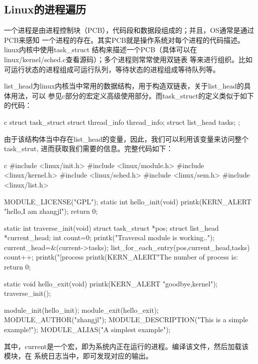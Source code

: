 \subsection{Linux的进程遍历}
一个进程是由进程控制块（PCB），代码段和数据段组成的；并且，OS通常是通过PCB来感知
一个进程的存在。其实PCB就是操作系统对每个进程的代码描述。linux内核中使用task\_struct
结构来描述一个PCB（具体可以在linux/kernel/sched.c查看源码）；多个进程则常常使用双链表
等来进行组织。比如可运行状态的进程组成可运行队列，等待状态的进程组成等待队列等。

list\_head为linux内核当中常用的数据结构，用于构造双链表，关于list\_head的具体用法，可以
参见c部分的宏定义高级使用部分。而task\_struct的定义类似于如下的代码：
\begin{code-block}{c}
struct task_struct {
        struct thread_info    thread_info;
        struct list_head      tasks;
};
\end{code-block}

由于该结构体当中存在list\_head的变量，因此，我们可以利用该变量来访问整个task\_strut,
进而获取我们需要的信息。完整代码如下：
\begin{code-block}{c}
#include <linux/init.h>
#include <linux/module.h>
#include <linux/kernel.h>
#include <linux/sched.h>
#include <linux/sem.h>
#include <linux/list.h>

MODULE_LICENSE("GPL");
static int hello_init(void)
{
        printk(KERN_ALERT "hello,I am zhangjl\n");
        return 0;
}

static int traverse_init(void)
{
       struct task_struct *pos;
       struct list_head *current_head;
       int count=0;
       printk("Traversal module is working..\n");
       current_head=&(current->tasks);
       list_for_each_entry(pos,current_head,tasks)
       {
              count++;
              printk("[process %
       }
       printk(KERN_ALERT"The number of process is:%
       return 0;
}

static void hello_exit(void)
{
    printk(KERN_ALERT "goodbye,kernel\n");
    traverse_init();
}

module_init(hello_init);
module_exit(hello_exit);
MODULE_AUTHOR("zhangjl");
MODULE_DESCRIPTION("This is a simple example!\n");
MODULE_ALIAS("A simplest example");

\end{code-block}

其中，current是一个宏，即为系统内正在运行的进程。编译该文件，然后加载该模块，在
系统日志当中，即可发现对应的输出。

